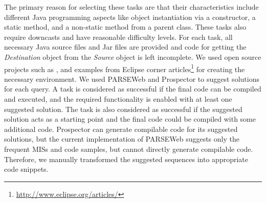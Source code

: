 The primary reason for selecting these tasks are that their
characteristics include different Java programming aspects like
object instantiation via a constructor, a static method, and a
non-static method from a parent class. These tasks also require
downcasts and have reasonable difficulty levels. For each task, all
necessary Java source files and Jar files are provided and code for
getting the \emph{Destination} object from the \emph{Source} object
is left incomplete. We used open source projects such as
, and examples from Eclipse corner
articles\footnote{\url{http://www.eclipse.org/articles/}} for
creating the necessary environment. We used PARSEWeb and Prospector
to suggest solutions for each query. A task is considered as
successful if the final code can be compiled and executed, and the
required functionality is enabled with at least one suggested
solution. The task is also considered as successful if the suggested
solution acts as a starting point and the final code could be
compiled with some additional code. Prospector can generate
compilable code for its suggested solutions, but the current
implementation of PARSEWeb suggests only the frequent MISs and code
samples, but cannot directly generate compilable code. Therefore, we
manually transformed the suggested sequences into appropriate code
snippets.
\setlength{\tabcolsep}{3pt}
